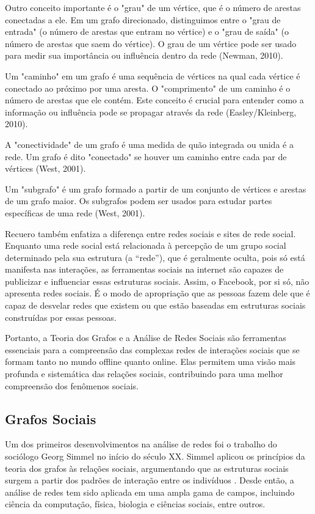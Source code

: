 Outro conceito importante é o "grau" de um vértice, que é o número de arestas conectadas a ele. Em um grafo direcionado, distinguimos entre o "grau de entrada" (o número de arestas que entram no vértice) e o "grau de saída" (o número de arestas que saem do vértice). O grau de um vértice pode ser usado para medir sua importância ou influência dentro da rede (Newman, 2010).

Um "caminho" em um grafo é uma sequência de vértices na qual cada vértice é conectado ao próximo por uma aresta. O "comprimento" de um caminho é o número de arestas que ele contém. Este conceito é crucial para entender como a informação ou influência pode se propagar através da rede (Easley/Kleinberg, 2010).

A "conectividade" de um grafo é uma medida de quão integrada ou unida é a rede. Um grafo é dito "conectado" se houver um caminho entre cada par de vértices (West, 2001).

Um "subgrafo" é um grafo formado a partir de um conjunto de vértices e arestas de um grafo maior. Os subgrafos podem ser usados para estudar partes específicas de uma rede (West, 2001).

Recuero também enfatiza a diferença entre redes sociais e sites de rede social. Enquanto uma rede social está relacionada à percepção de um grupo social determinado pela sua estrutura (a “rede”), que é geralmente oculta, pois só está manifesta nas interações, as ferramentas sociais na internet são capazes de publicizar e influenciar essas estruturas sociais. Assim, o Facebook, por si só, não apresenta redes sociais. É o modo de apropriação que as pessoas fazem dele que é capaz de desvelar redes que existem ou que estão baseadas em estruturas sociais construídas por essas pessoas.

Portanto, a Teoria dos Grafos e a Análise de Redes Sociais são ferramentas essenciais para a compreensão das complexas redes de interações sociais que se formam tanto no mundo offline quanto online. Elas permitem uma visão mais profunda e sistemática das relações sociais, contribuindo para uma melhor compreensão dos fenômenos sociais.

\subsection*{Grafos Sociais}

Um dos primeiros desenvolvimentos na análise de redes foi o trabalho do sociólogo Georg Simmel no início do século XX. Simmel aplicou os princípios da teoria dos grafos às relações sociais, argumentando que as estruturas sociais surgem a partir dos padrões de interação entre os indivíduos \cite[]{2021_Hollstein}. Desde então, a análise de redes tem sido aplicada em uma ampla gama de campos, incluindo ciência da computação, física, biologia e ciências sociais, entre outros.

